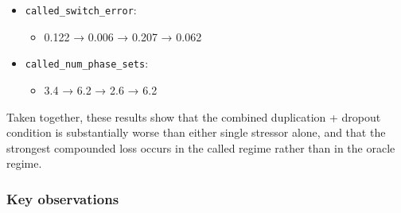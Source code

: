 \documentclass[
]{article}
\providecommand{\tightlist}{%
  \setlength{\itemsep}{0pt}\setlength{\parskip}{0pt}}
\begin{document}
\begin{itemize}
  \begin{itemize}
  \tightlist
  \item
    0.890 → 0.981 → 0.802 → 0.940
  \end{itemize}
\item
  \texttt{called\_switch\_error}:

  \begin{itemize}
  \tightlist
  \item
    0.122 → 0.006 → 0.207 → 0.062
  \end{itemize}
\item
  \texttt{called\_num\_phase\_sets}:

  \begin{itemize}
  \tightlist
  \item
    3.4 → 6.2 → 2.6 → 6.2
  \end{itemize}
\end{itemize}

Taken together, these results show that the combined duplication +
dropout condition is substantially worse than either single stressor
alone, and that the strongest compounded loss occurs in the called
regime rather than in the oracle regime.

\subsubsection{Key observations}\label{key-observations-6}
\end{document}
